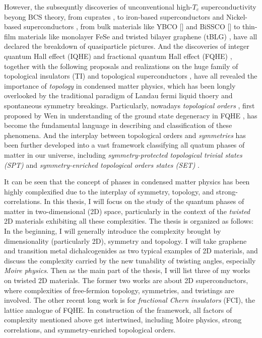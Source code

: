         However, the subsequntly discoveries of unconventional high-$T_c$ superconductivity beyong BCS theory, from cuprates \cite{bednorz1986possible}, to iron-based superconductors \cite{kamihara2006iron} and Nickel-based superconductors \cite{li2019superconductivity}, from bulk materials like YBCO [] and BiSSCO [] to thin-film materials like monolayer FeSe \cite{liu2012electronic} and twisted bilayer graphene (tBLG) \cite{cao2018correlated}\cite{cao2018unconventional}, have all declared the breakdown of quasiparticle pictures. And the discoveries of integer quantum Hall effect (IQHE) \cite{klitzing1980new} and fractional quantum Hall effect (FQHE) \cite{tsui1982two}\cite{willett1987observation}, together with the following proposals and realizations on the huge family of topological insulators (TI) \cite{bernevig2006quantum}\cite{hsieh2008topological} and topological superconductors \cite{xu2014artificial}, have all revealed the importance of \emph{topology} in condensed matter physics, which has been longly overlooked by the traditional paradigm of Landau fermi liquid thoery and spontaneous symmetry breakings. Particularly, nowadays \emph{topological orders} \cite{wen1990topological}\cite{levin2005string}\cite{chen2010local}\cite{wen2002quantum}, first proposed by Wen in understanding of the ground state degeneracy in FQHE \cite{wen1990ground}, has become the fundamental language in describing and classification of these phenomena. And the interplay between topological orders and \emph{symmetries} has been further developed into a vast framework classifying all quatum phases of matter in our universe, including \emph{symmetry-protected topological trivial states (SPT)} \cite{chen2013symmetry} and \emph{symmetry-enriched topological orders states (SET)} \cite{mesaros2013classification}.

        It can be seen that the concept of phases in condensed matter physics has been highly complexified due to the interplay of symmetry, topology, and strong-correlations. In this thesis, I will focus on the study of the quantum phases of matter in two-dimensional (2D) space, particularly in the context of the \emph{twisted} 2D materials exhibiting all these complexities. The thesis is organized as follows: In the beginning, I will generally introduce the complexity brought by dimensionality (particularly 2D), symmetry and topology. I will take graphene and transition metal dichalcogenides as two typical examples of 2D materials, and discuss the complexity carried by the new tunability of twisting angles, especially \emph{Moire physics}. Then as the main part of the thesis, I will list three of my works on twisted 2D materials. The former two works are about 2D superconductors, where complexities of free-fermion topology, symmetries, and twistings are involved. The other recent long work is for \emph{fractional Chern insulators} (FCI), the lattice analogue of FQHE. In construction of the framework, all factors of complexity mentioned above get intertwined, including Moire physics, strong correlations, and symmetry-enriched topological orders.


